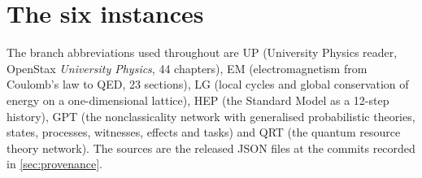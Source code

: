 \documentclass[11pt,a4paper,twoside,openany]{report}
\theoremstyle{plain}
\theoremstyle{definition}
\theoremstyle{remark}
\begin{document}
\section{The six instances}
\begin{table}[htbp]\centering\small
\caption{The six released instances normalised in this thesis. Type D: dynamic/pedagogical reader; H: historical theory-building; E: effect/resource network. Counts are those of the normalised graphs (\cref{ch:graph}); for the Standard Model branch they are the atlas view (every node that ever existed, routes of the final step). OR targets: nodes with two or more routes into them.}\label{tab:instances}
\resizebox{\textwidth}{!}{}
\end{table}
The branch abbreviations used throughout are UP (University Physics reader, OpenStax \emph{University Physics}, 44 chapters), EM (electromagnetism from Coulomb's law to QED, 23 sections), LG (local cycles and global conservation of energy on a one-dimensional lattice), HEP (the Standard Model as a 12-step history), GPT (the nonclassicality network with generalised probabilistic theories, states, processes, witnesses, effects and tasks) and QRT (the quantum resource theory network). The sources are the released JSON files at the commits recorded in \cref{sec:provenance}.
\end{document}
